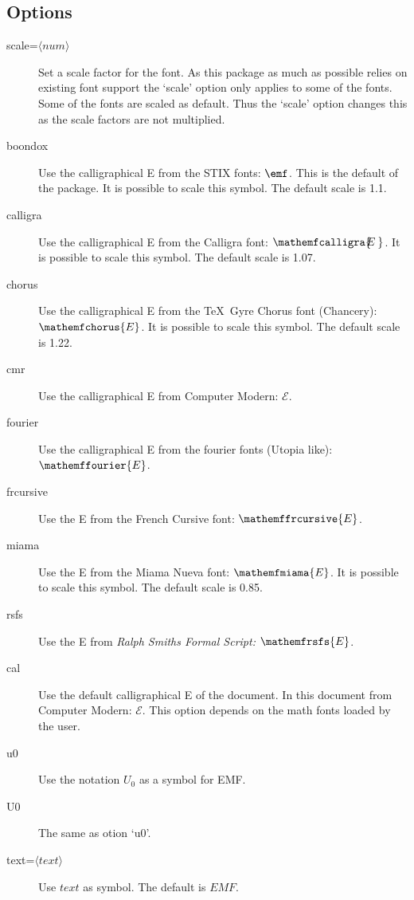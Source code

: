 \documentclass[11pt,a4paper,british]{scrartcl}
\def\emfcalligra{\mathemfcalligra{\mkern-7muE\mkern4mu}}%
\def\emfchorus{\mathemfchorus{E}}
\def\emffourier{\mathemffourier{E}}%
\def\emffrcursive{\mathemffrcursive{E}}%
\def\emfmiama{\mathemfmiama{E}}
\def\emfrsfs{\mathemfrsfs{E}}%
\begin{document}
\subsection{Options}
\label{sec:options}
\begin{description}
\item[scale=$\langle num\rangle$] Set a scale factor for the font. As
  this package as much as possible relies on existing font support the
  `scale' option only applies to some of the fonts. Some of the fonts
  are scaled as default. Thus the `scale' option changes this as the
  scale factors are not multiplied.

\item[boondox] Use the calligraphical E from the STIX fonts: $\emf$.
  This is the default of the package. It is possible to scale this
  symbol. The default scale is 1.1.

\item[calligra] Use the calligraphical E from the Calligra font:
  $\emfcalligra$. It is possible to scale this
  symbol. The default scale is 1.07.

\item[chorus] Use the calligraphical E from the \TeX\ Gyre Chorus
  font (Chancery): $\emfchorus$. It is
  possible to scale this symbol. The default scale is 1.22.

\item[cmr] Use the calligraphical E from Computer Modern: $\mathcal{E}$.

\item[fourier] Use the calligraphical E from the fourier fonts
  (Utopia like): $\emffourier$.

\item[frcursive] Use the E from the French Cursive font: $\emffrcursive$.

\item[miama] Use the E from the Miama Nueva font: $\emfmiama$. It is
  possible to scale this symbol. The default scale is 0.85.

\item[rsfs] Use the E from \textsl{Ralph Smiths Formal Script:} $\emfrsfs$.

\item[cal] Use the default calligraphical E of the document. In this
  document from Computer Modern: $\mathcal{E}$. This option depends on
  the math fonts loaded by the user.

\item[u0] Use the notation $U_0$ as a symbol for EMF.

\item[U0] The same as otion `u0'.

\item[text=$\langle \mathit{text}\rangle$] Use $\mathit{text}$ as
  symbol. The default is $\mathit{EMF}$.
\end{description}
\end{document}
